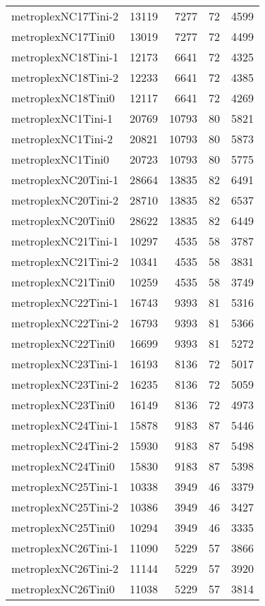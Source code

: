 \begin{longtable}{lrrrr}
metroplexNC17Tini-2 & 13119 & 7277 & 72 & 4599 \\
metroplexNC17Tini0 & 13019 & 7277 & 72 & 4499 \\
metroplexNC18Tini-1 & 12173 & 6641 & 72 & 4325 \\
metroplexNC18Tini-2 & 12233 & 6641 & 72 & 4385 \\
metroplexNC18Tini0 & 12117 & 6641 & 72 & 4269 \\
metroplexNC1Tini-1 & 20769 & 10793 & 80 & 5821 \\
metroplexNC1Tini-2 & 20821 & 10793 & 80 & 5873 \\
metroplexNC1Tini0 & 20723 & 10793 & 80 & 5775 \\
metroplexNC20Tini-1 & 28664 & 13835 & 82 & 6491 \\
metroplexNC20Tini-2 & 28710 & 13835 & 82 & 6537 \\
metroplexNC20Tini0 & 28622 & 13835 & 82 & 6449 \\
metroplexNC21Tini-1 & 10297 & 4535 & 58 & 3787 \\
metroplexNC21Tini-2 & 10341 & 4535 & 58 & 3831 \\
metroplexNC21Tini0 & 10259 & 4535 & 58 & 3749 \\
metroplexNC22Tini-1 & 16743 & 9393 & 81 & 5316 \\
metroplexNC22Tini-2 & 16793 & 9393 & 81 & 5366 \\
metroplexNC22Tini0 & 16699 & 9393 & 81 & 5272 \\
metroplexNC23Tini-1 & 16193 & 8136 & 72 & 5017 \\
metroplexNC23Tini-2 & 16235 & 8136 & 72 & 5059 \\
metroplexNC23Tini0 & 16149 & 8136 & 72 & 4973 \\
metroplexNC24Tini-1 & 15878 & 9183 & 87 & 5446 \\
metroplexNC24Tini-2 & 15930 & 9183 & 87 & 5498 \\
metroplexNC24Tini0 & 15830 & 9183 & 87 & 5398 \\
metroplexNC25Tini-1 & 10338 & 3949 & 46 & 3379 \\
metroplexNC25Tini-2 & 10386 & 3949 & 46 & 3427 \\
metroplexNC25Tini0 & 10294 & 3949 & 46 & 3335 \\
metroplexNC26Tini-1 & 11090 & 5229 & 57 & 3866 \\
metroplexNC26Tini-2 & 11144 & 5229 & 57 & 3920 \\
metroplexNC26Tini0 & 11038 & 5229 & 57 & 3814 \\

\end{longtable}
